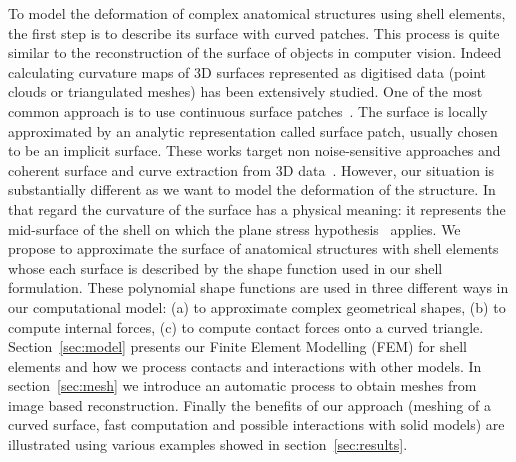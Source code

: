 \documentclass{llncs}
\begin{document}
To model the deformation of complex anatomical structures using shell elements, the first step is to describe its surface with curved patches. This process is quite similar to the reconstruction of the surface of objects in computer vision. Indeed calculating curvature maps of 3D surfaces represented as digitised data (point clouds or triangulated meshes) has been extensively studied. One of the most common approach is to use continuous surface patches~\cite{Kolb95,Douros02}. The surface is locally approximated by an analytic representation called surface patch, usually chosen to be an implicit surface. These works target non noise-sensitive approaches and coherent surface and curve extraction from 3D data~\cite{Tang99}. 
However, our situation is substantially different as we want to model the deformation of the structure. In that regard the curvature of the surface has a physical meaning: it represents the mid-surface of the shell on which the plane stress hypothesis~\cite{Liu03} applies. We propose to approximate the surface of anatomical structures with shell elements whose each surface is described by the shape function used in our shell formulation.
These polynomial shape functions are used in three different ways in our computational model: (a) to approximate complex geometrical shapes, (b) to compute internal forces, (c) to compute contact forces onto a curved triangle. Section~\ref{sec:model} presents our Finite Element Modelling (FEM) for shell elements and how we process contacts and interactions with other models. In section~\ref{sec:mesh} we introduce an automatic process to obtain meshes from image based reconstruction. Finally the benefits of our approach (meshing of a curved surface, fast computation and possible interactions with solid models) are illustrated using various examples showed in section~\ref{sec:results}.
\end{document}

